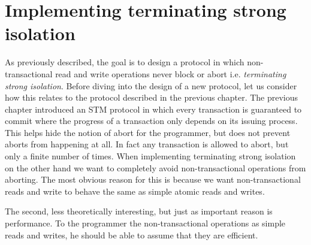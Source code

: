 


\section{Implementing terminating strong isolation}
\label{sec:badthings}

As previously described, the goal is to design a protocol in which
non-transactional read and write operations never block or abort
i.e. {\it terminating strong isolation}.
Before diving into the design of a new protocol, let us consider how
this relates to the protocol described in the previous chapter.
The previous chapter introduced an STM protocol in which every transaction
is guaranteed to commit where the progress of a transaction only depends on
its issuing process.
This helps hide the notion of abort for the programmer, but does
not prevent aborts from happening at all.
In fact any transaction is allowed to abort, but only a finite number
of times.
When implementing terminating strong isolation on the other hand we
want to completely avoid non-transactional operations from aborting.
The most obvious reason for this is because we want non-transactional reads and write
to behave the same as simple atomic reads and writes.

The second, less theoretically interesting, but just as important reason
is performance.
To the programmer the non-transactional operations as simple reads and
writes, he should be able to assume that they are efficient.

